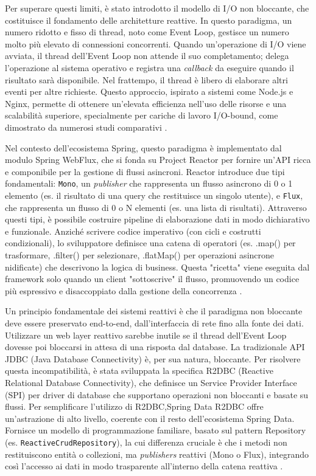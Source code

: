 \documentclass[12pt,a4paper,openright,twoside]{book}
\begin{document}
Per superare questi limiti, è stato introdotto il modello di I/O non bloccante, che costituisce il fondamento delle architetture reattive. In questo paradigma, un numero ridotto e fisso di thread, noto come Event Loop, gestisce un numero molto più elevato di connessioni concorrenti. Quando un'operazione di I/O viene avviata, il thread dell'Event Loop non attende il suo completamento; delega l'operazione al sistema operativo e registra una \textit{callback} da eseguire quando il risultato sarà disponibile. Nel frattempo, il thread è libero di elaborare altri eventi per altre richieste. Questo approccio, ispirato a sistemi come Node.js e Nginx, permette di ottenere un'elevata efficienza nell'uso delle risorse e una scalabilità superiore, specialmente per cariche di lavoro I/O-bound, come dimostrato da numerosi studi comparativi \cite{bth2015performance, derezinska2020performance}.

Nel contesto dell'ecosistema Spring, questo paradigma è implementato dal modulo Spring WebFlux, che si fonda su Project Reactor per fornire un'API ricca e componibile per la gestione di flussi asincroni. Reactor introduce due tipi fondamentali: \texttt{Mono}, un \textit{publisher} che rappresenta un flusso asincrono di 0 o 1 elemento (es. il risultato di una query che restituisce un singolo utente), e \texttt{Flux}, che rappresenta un flusso di 0 o N elementi (es. una lista di risultati). Attraverso questi tipi, è possibile costruire pipeline di elaborazione dati in modo dichiarativo e funzionale. Anziché scrivere codice imperativo (con cicli e costrutti condizionali), lo sviluppatore definisce una catena di operatori (es. .map() per trasformare, .filter() per selezionare, .flatMap() per operazioni asincrone nidificate) che descrivono la logica di business. Questa "ricetta" viene eseguita dal framework solo quando un client "sottoscrive" il flusso, promuovendo un codice più espressivo e disaccoppiato dalla gestione della concorrenza \cite{spring_reactive}.

Un principio fondamentale dei sistemi reattivi è che il paradigma non bloccante deve essere preservato end-to-end, dall'interfaccia di rete fino alla fonte dei dati. Utilizzare un web layer reattivo sarebbe inutile se il thread dell'Event Loop dovesse poi bloccarsi in attesa di una risposta dal database. La tradizionale API JDBC (Java Database Connectivity) è, per sua natura, bloccante. Per risolvere questa incompatibilità, è stata sviluppata la specifica R2DBC (Reactive Relational Database Connectivity), che definisce un Service Provider Interface (SPI) per driver di database che supportano operazioni non bloccanti e basate su flussi. Per semplificare l'utilizzo di R2DBC,Spring Data R2DBC offre un'astrazione di alto livello, coerente con il resto dell'ecosistema Spring Data. Fornisce un modello di programmazione familiare, basato sul pattern Repository (es. \texttt{ReactiveCrudRepository}), la cui differenza cruciale è che i metodi non restituiscono entità o collezioni, ma \textit{publishers} reattivi (Mono o Flux), integrando così l'accesso ai dati in modo trasparente all'interno della catena reattiva \cite{spring_reactive}. 
\end{document}
